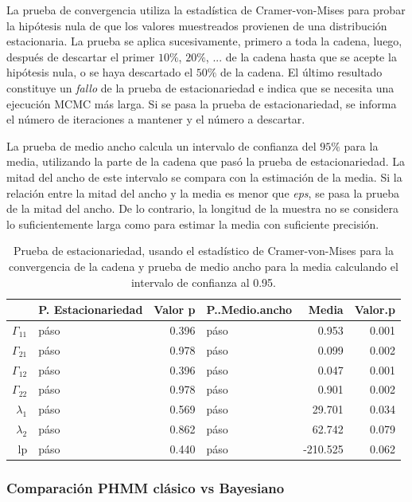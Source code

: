 \documentclass[a4paper]{article}\usepackage[]{graphicx}\usepackage[]{color}
\begin{document}
La prueba de convergencia utiliza la estadística de Cramer-von-Mises para probar la hipótesis nula de que los valores muestreados provienen de una distribución estacionaria. La prueba se aplica sucesivamente, primero a toda la cadena, luego, después de descartar el primer $10 \%$, $20 \%$, ... de la cadena hasta que se acepte la hipótesis nula, o se haya descartado el $50 \%$ de la cadena. El último resultado constituye un \emph{fallo} de la prueba de estacionariedad e indica que se necesita una ejecución MCMC más larga. Si se pasa la prueba de estacionariedad, se informa el número de iteraciones a mantener y el número a descartar.

La prueba de medio ancho calcula un intervalo de confianza del $95 \%$ para la media, utilizando la parte de la cadena que pasó la prueba de estacionariedad. La mitad del ancho de este intervalo se compara con la estimación de la media. Si la relación entre la mitad del ancho y la media es menor que \emph{eps}, se pasa la prueba de la mitad del ancho. De lo contrario, la longitud de la muestra no se considera lo suficientemente larga como para estimar la media con suficiente precisión.

\begin{table}[ht]
\centering
\begin{tabular}{rlrlrr}
  \hline
 & P. Estacionariedad & Valor p & P..Medio.ancho & Media & Valor.p \\ 
  \hline
$\Gamma_{11}$ & páso & 0.396 & páso & 0.953 & 0.001 \\ 
  $\Gamma_{21}$ & páso & 0.978 & páso & 0.099 & 0.002 \\ 
  $\Gamma_{12}$ & páso & 0.396 & páso & 0.047 & 0.001 \\ 
  $\Gamma_{22}$ & páso & 0.978 & páso & 0.901 & 0.002 \\ 
  $\lambda_1$ & páso & 0.569 & páso & 29.701 & 0.034 \\ 
  $\lambda_2$ & páso & 0.862 & páso & 62.742 & 0.079 \\ 
  lp & páso & 0.440 & páso & -210.525 & 0.062 \\ 
   \hline
\end{tabular}
\caption{Prueba de estacionariedad, usando el estadístico de Cramer-von-Mises para la convergencia de la cadena y prueba de medio ancho para la media calculando el intervalo de confianza al 0.95.} 
\end{table}


\subsubsection{Comparación PHMM clásico vs Bayesiano}
\end{document}
